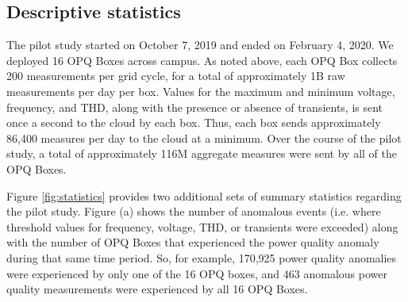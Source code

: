 \subsection{Descriptive statistics}

The pilot study started on October 7, 2019 and ended on February 4, 2020. We deployed 16 OPQ Boxes across campus. As noted above, each OPQ Box collects 200 measurements per grid cycle, for a total of approximately 1B raw measurements per day per box.  Values for the maximum and minimum voltage, frequency, and THD, along with the presence or absence of transients, is sent once a second to the cloud by each box. Thus, each box sends approximately 86,400 measures per day to the cloud at a minimum. Over the course of the pilot study, a total of approximately 116M aggregate measures were sent by all of the OPQ Boxes.

Figure \ref{fig:statistics} provides two additional sets of summary statistics regarding the pilot study.  Figure (a) shows the number of anomalous events (i.e. where threshold values for frequency, voltage, THD, or transients were exceeded) along with the number of OPQ Boxes that experienced the power quality anomaly during that same time period. So, for example, 170,925 power quality anomalies were experienced by only one of the 16 OPQ boxes, and 463 anomalous power quality measurements were experienced by all 16 OPQ Boxes.

